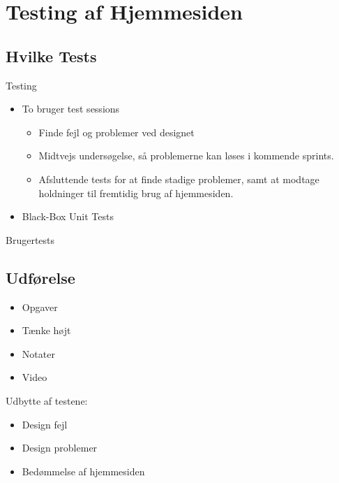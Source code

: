 \section{Testing af Hjemmesiden}

\subsection{Hvilke Tests}
\begin{frame}{Testing}
	
	\begin{itemize}
	\item	To bruger test sessions
		\begin{itemize}
			\item Finde fejl og problemer ved designet
			\item Midtvejs undersøgelse, så problemerne kan løses i kommende sprints.
			\item Afsluttende tests for at finde stadige problemer, samt at modtage holdninger til fremtidig brug af hjemmesiden.
		\end{itemize}
	\item 	Black-Box Unit Tests
	
	\end{itemize}
	
\end{frame}

\begin{frame}{Brugertests}
	\subsection{Udførelse}
	
	\begin{itemize}
		\item Opgaver 
		\item Tænke højt
		\item Notater
		\item Video		
	\end{itemize}
	
	Udbytte af testene:
	\begin{itemize}
		\item Design fejl
		\item Design problemer
		\item Bedømmelse af hjemmesiden
	\end{itemize}
	
\end{frame}


